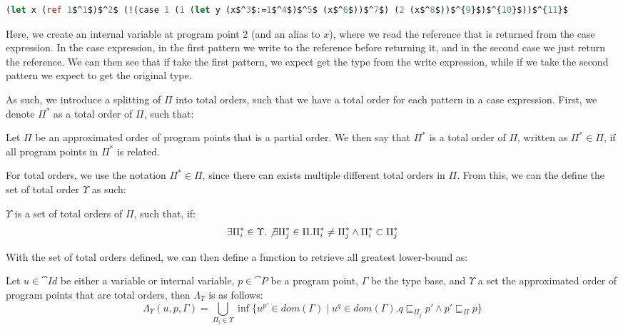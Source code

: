 \documentclass[../../master.tex]{subfiles}
\begin{document}
\begin{lstlisting}[language=Caml, mathescape=true]
(let x (ref 1$^1$)$^2$ (!(case 1 (1 (let y (x$^3$:=1$^4$)$^5$ (x$^6$))$^7$) (2 (x$^8$))$^{9}$)$^{10}$))$^{11}$
\end{lstlisting}
Here, we create an internal variable at program point $2$ (and an alias to $x$), where we read the reference that is returned from the case expression.
In the case expression, in the first pattern we write to the reference before returning it, and in the second case we just return the reference.
We can then see that if take the first pattern, we expect get the type from the write expression, while if we take the second pattern we expect to get the original type.

As such, we introduce a splitting of $\Pi$ into total orders, such that we have a total order for each pattern in a case expression.
First, we denote $\Pi^{*}$ as a total order of $\Pi$, such that:

\begin{definition}
	Let $\Pi$ be an approximated order of program points that is a partial order.
	We then say that $\Pi^{*}$ is a total order of $\Pi$, written as $\Pi^{*}\in\Pi$, if all program points in $\Pi^{*}$ is related.
\end{definition}

For total orders, we use the notation $\Pi^{*}\in\Pi$, since there can exists multiple different total orders in $\Pi$.
From this, we can the define the set of total order $\Upsilon$ as such:

\begin{definition}[$\Upsilon$]
	$\Upsilon$ is a set of total orders of $\Pi$, such that, if:
	$$\exists \Pi^{*}_i\in\Upsilon.\not\exists\Pi^{*}_j\in\Pi.\Pi^{*}_i\neq\Pi^{*}_j\wedge\Pi^{*}_i\subset\Pi^{*}_j$$
\end{definition}

With the set of total orders defined, we can then define a function to retrieve all greatest lower-bound as:

\begin{definition}
	Let $u\in \cat{Id}$ be either a variable or internal variable, $p\in\cat{P}$ be a program point, $\Gamma$ be the type base, and $\Upsilon$ a set the approximated order of program points that are total orders, then $\Lambda_\Upsilon$ is as follows:
	$$\Lambda_\Upsilon(u,p,\Gamma)=\bigcup_{\Pi_i\in\Upsilon}\inf\{u^{p'}\in dom(\Gamma)\mid u^q\in dom(\Gamma).q\sqsubseteq_{\Pi_j} p'\wedge p'\sqsubseteq_\Pi p\}$$
\end{definition}
\fi
\end{document}
